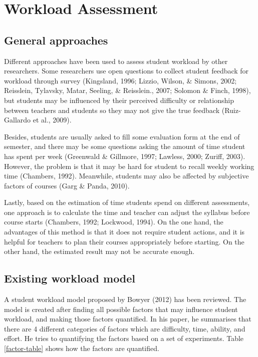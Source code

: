 \documentclass[fyp]{socreport}
\begin{document}
\section{Workload Assessment}
\subsection{General approaches}
Different approaches have been used to assess student workload by other researchers. Some researchers use open questions to collect student feedback for workload through survey (Kingsland, 1996; Lizzio, Wilson, \& Simons, 2002; Reisslein, Tylavsky, Matar, Seeling, \& Reisslein., 2007; Solomon \& Finch, 1998), but students may be influenced by their perceived difficulty or relationship between teachers and students so they may not give the true feedback (Ruiz-Gallardo et al., 2009).

Besides, students are usually asked to fill some evaluation form at the end of semester, and there may be some questions asking the amount of time student has spent per week (Greenwald \& Gillmore, 1997; Lawless, 2000; Zuriff, 2003). However, the problem is that it may be hard for student to recall weekly working time (Chambers, 1992). Meanwhile, students may also be affected by subjective factors of courses (Garg \& Panda, 2010).

Lastly, based on the estimation of time students spend on different assessments, one approach is to calculate the time and teacher can adjust the syllabus before course starts (Chambers, 1992; Lockwood, 1994). On the one hand, the advantages of this method is that it does not require student actions, and it is helpful for teachers to plan their courses appropriately before starting. On the other hand, the estimated result may not be accurate enough.

\subsection{Existing workload model}
A student workload model proposed by Bowyer (2012) has been reviewed. The model is created after finding all possible factors that may influence student workload, and making those factors quantified. In his paper, he summarises that there are 4 different categories of factors which are difficulty, time, ability, and effort. He tries to quantifying the factors based on a set of experiments. Table \ref{factor-table} shows how the factors are quantified.
\end{document}
